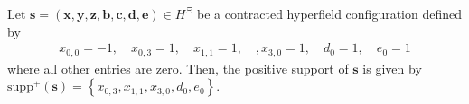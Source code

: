 \begin{example}
    Let \( \mathbf{s} = (\mathbf{x}, \mathbf{y}, \mathbf{z}, \mathbf{b}, \mathbf{c}, \mathbf{d}, \mathbf{e}) \in H^{\Xi}\) be a contracted hyperfield configuration defined by 
    \begin{align*}
        x_{0,0} = -1, \quad x_{0,3} = 1, \quad x_{1,1} = 1, \quad, x_{3,0} = 1, \quad d_0 = 1, \quad e_0 = 1
    \end{align*}
    where all other entries are zero. Then, the positive support of \( \mathbf{s} \) is given by \( \mathrm{supp}^+(\mathbf{s}) = \left\{ x_{0,3}, x_{1,1}, x_{3,0}, d_0, e_0 \right\} \).
\end{example}